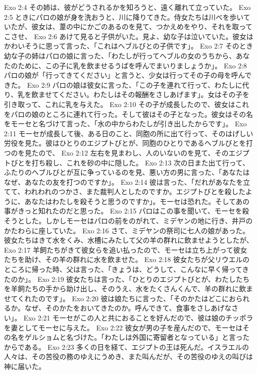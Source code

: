 Exo 2:4  その姉は、彼がどうされるかを知ろうと、遠く離れて立っていた。
Exo 2:5  ときにパロの娘が身を洗おうと、川に降りてきた。侍女たちは川べを歩いていたが、彼女は、葦の中にかごのあるのを見て、つかえめをやり、それを取ってこさせ、
Exo 2:6  あけて見ると子供がいた。見よ、幼な子は泣いていた。彼女はかわいそうに思って言った、「これはヘブルびとの子供です」。
Exo 2:7  そのとき幼な子の姉はパロの娘に言った、「わたしが行ってヘブルの女のうちから、あなたのために、この子に乳を飲ませるうばを呼んでまいりましょうか」。
Exo 2:8  パロの娘が「行ってきてください」と言うと、少女は行ってその子の母を呼んできた。
Exo 2:9  パロの娘は彼女に言った、「この子を連れて行って、わたしに代り、乳を飲ませてください。わたしはその報酬をさしあげます」。女はその子を引き取って、これに乳を与えた。
Exo 2:10  その子が成長したので、彼女はこれをパロの娘のところに連れて行った。そして彼はその子となった。彼女はその名をモーセと名づけて言った、「水の中からわたしが引き出したからです」。
Exo 2:11  モーセが成長して後、ある日のこと、同胞の所に出て行って、そのはげしい労役を見た。彼はひとりのエジプトびとが、同胞のひとりであるヘブルびとを打つのを見たので、
Exo 2:12  左右を見まわし、人のいないのを見て、そのエジプトびとを打ち殺し、これを砂の中に隠した。
Exo 2:13  次の日また出て行って、ふたりのヘブルびとが互に争っているのを見、悪い方の男に言った、「あなたはなぜ、あなたの友を打つのですか」。
Exo 2:14  彼は言った、「だれがあなたを立てて、われわれのつかさ、また裁判人としたのですか。エジプトびとを殺したように、あなたはわたしを殺そうと思うのですか」。モーセは恐れた。そしてあの事がきっと知れたのだと思った。
Exo 2:15  パロはこの事を聞いて、モーセを殺そうとした。しかしモーセはパロの前をのがれて、ミデヤンの地に行き、井戸のかたわらに座していた。
Exo 2:16  さて、ミデヤンの祭司に七人の娘があった。彼女たちはきて水をくみ、水槽にみたして父の羊の群れに飲ませようとしたが、
Exo 2:17  羊飼たちがきて彼女らを追い払ったので、モーセは立ち上がって彼女たちを助け、その羊の群れに水を飲ませた。
Exo 2:18  彼女たちが父リウエルのところに帰った時、父は言った、「きょうは、どうして、こんなに早く帰ってきたのか」。
Exo 2:19  彼女たちは言った、「ひとりのエジプトびとが、わたしたちを羊飼たちの手から助け出し、そのうえ、水をたくさんくんで、羊の群れに飲ませてくれたのです」。
Exo 2:20  彼は娘たちに言った、「そのかたはどこにおられるか。なぜ、そのかたをおいてきたのか。呼んできて、食事をさしあげなさい」。
Exo 2:21  モーセがこの人と共におることを好んだので、彼は娘のチッポラを妻としてモーセに与えた。
Exo 2:22  彼女が男の子を産んだので、モーセはその名をゲルショムと名づけた。「わたしは外国に寄留者となっている」と言ったからである。
Exo 2:23  多くの日を経て、エジプトの王は死んだ。イスラエルの人々は、その苦役の務のゆえにうめき、また叫んだが、その苦役のゆえの叫びは神に届いた。
